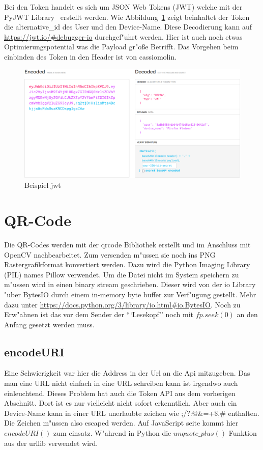 Bei den Token handelt es sich um JSON Web Tokens (JWT) welche mit der PyJWT Library~\cite{jwt} erstellt werden.
Wie Abbildung~\ref{fig: jwt} zeigt beinhaltet der Token die alternative\_id des User und den Device-Name.
Diese Decodierung kann auf \url{https://jwt.io/#debugger-io} durchgef{"u}hrt werden.
Hier ist auch noch etwas Optimierungspotential was die Payload gr{"o}\ss e Betrifft.
Das Vorgehen beim einbinden des Token in den Header ist von cassiomolin\cite{cassiomolin}.

\begin{figure}[h]
    \centering
    \includegraphics[width=\textwidth]{jwt}
    \caption{Beispiel jwt}
    \label{fig: jwt}
\end{figure}

\section{QR-Code}\label{sec:qr}
Die QR-Codes werden mit der qrcode Bibliothek erstellt und im Anschluss mit OpenCV nachbearbeitet.
Zum versenden m{"u}ssen sie noch ins PNG Rastergrafikformat konvertiert werden.
Dazu wird die Python Imaging Library (PIL) names Pillow verwendet.
Um die Datei nicht im System speichern zu m{"u}ssen wird in einen binary stream geschrieben.
Dieser wird von der io Library {"u}ber BytesIO durch einem in-memory byte buffer zur Verf{"u}gung gestellt.
Mehr dazu unter \url{https://docs.python.org/3/library/io.html#io.BytesIO}.
Noch zu Erw{"a}hnen ist das vor dem Sender der ```Lesekopf'' noch mit $fp.seek(0)$ an den Anfang gesetzt werden muss.

\subsection{encodeURI}\label{subsec:encodeuri}
Eine Schwierigkeit war hier die Address in der Url an die Api mitzugeben.
Das man eine URL nicht einfach in eine URL schreiben kann ist irgendwo auch einleuchtend.
Dieses Problem hat auch die Token API aus dem vorherigen Abschnitt.
Dort ist es nur vielleicht nicht sofort erkenntlich.
Aber auch ein Device-Name kann in einer URL unerlaubte zeichen wie ;/?:@\&=+\$,\# enthalten.
Die Zeichen m{"u}ssen also escaped werden.
Auf JavaScript seite kommt hier $encodeURI()$\cite{encodeURI} zum einsatz.
W{"a}hrend in Python die $unquote\_plus()$\cite{unquoteplus} Funktion aus der urllib verwendet wird.


